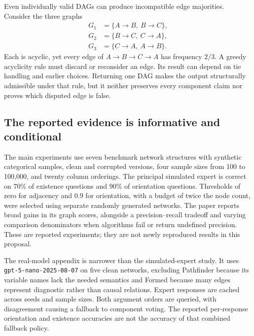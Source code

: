 Even individually valid DAGs can produce incompatible edge majorities. Consider
the three graphs
\begin{equation}
 \begin{split}
 G_1&=\{A\rightarrow B,\ B\rightarrow C\},\\
 G_2&=\{B\rightarrow C,\ C\rightarrow A\},\\
 G_3&=\{C\rightarrow A,\ A\rightarrow B\}.
 \end{split}
 \label{exec20:expert-cycle}
\end{equation}
Each is acyclic, yet every edge of $A\rightarrow B\rightarrow C\rightarrow A$
has frequency $2/3$. A greedy acyclicity rule must discard or reconsider an
edge. Its result can depend on tie handling and earlier choices. Returning one
DAG makes the output structurally admissible under that rule, but it neither
preserves every component claim nor proves which disputed edge is false.
\citep{exec20_expert_averaging_reference}

\subsection{The reported evidence is informative and conditional}
\label{exec20:expert-evidence}

The main experiments use seven benchmark network structures with synthetic
categorical samples, clean and corrupted versions, four sample sizes from 100
to 100,000, and twenty column orderings. The principal simulated expert is
correct on 70\% of existence questions and 90\% of orientation questions.
Thresholds of zero for adjacency and 0.9 for orientation, with a budget of twice
the node count, were selected using separate randomly generated networks. The
paper reports broad gains in its graph scores, alongside a precision--recall
tradeoff and varying comparison denominators when algorithms fail or return
undefined precision. These are reported experiments; they are not newly
reproduced results in this proposal. \citep{exec20_expert_averaging}

The real-model appendix is narrower than the simulated-expert study. It uses
\texttt{gpt-5-nano-2025-08-07} on five clean networks, excluding Pathfinder
because its variable names lack the needed semantics and Formed because many
edges represent diagnostic rather than causal relations. Expert responses are
cached across seeds and sample sizes. Both argument orders are queried, with
disagreement causing a fallback to component voting. The reported per-response
orientation and existence accuracies are not the accuracy of that combined
fallback policy. \citep{exec20_expert_averaging}

